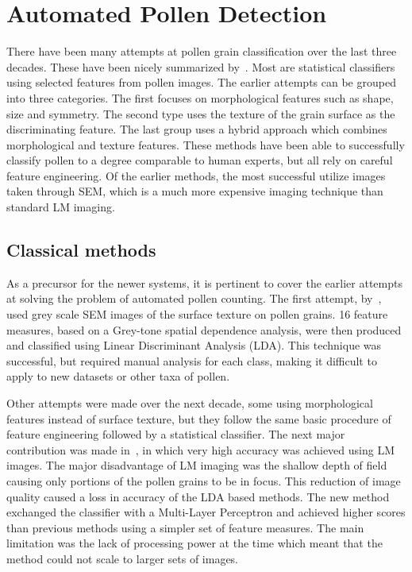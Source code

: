 \section{Automated Pollen Detection}\label{sec:rel-pollen}
There have been many attempts at pollen grain classification over the last three decades.
These have been nicely summarized by\ \textcite{sevillano_improving_2018}.
Most are statistical classifiers using selected features from pollen images.
The earlier attempts can be grouped into three categories.
The first focuses on morphological features such as shape, size and symmetry.
The second type uses the texture of the grain surface as the discriminating feature.
The last group uses a hybrid approach which combines morphological and texture features.
These methods have been able to successfully classify pollen to a degree comparable to human experts, but all rely on careful feature engineering.
Of the earlier methods, the most successful utilize images taken through SEM, which is a much more expensive imaging technique than standard LM imaging.

\subsection{Classical methods}
As a precursor for the newer systems, it is pertinent to cover the earlier attempts at solving the problem of automated pollen counting.
The first attempt, by\ \textcite{langford_computerized_1990}, used grey scale SEM images of the surface texture on pollen grains.
16 feature measures, based on a Grey-tone spatial dependence analysis, were then produced and classified using Linear Discriminant Analysis (LDA).
This technique was successful, but required manual analysis for each class, making it difficult to apply to new datasets or other taxa of pollen.

Other attempts were made over the next decade, some using morphological features instead of surface texture, but they follow the same basic procedure of feature engineering followed by a statistical classifier.
The next major contribution was made in\ \textcite{li_pollen_1999}, in which very high accuracy was achieved using LM images.
The major disadvantage of LM imaging was the shallow depth of field causing only portions of the pollen grains to be in focus.
This reduction of image quality caused a loss in accuracy of the LDA based methods.
The new method exchanged the classifier with a Multi-Layer Perceptron and achieved higher scores than previous methods using a simpler set of feature measures.
The main limitation was the lack of processing power at the time which meant that the method could not scale to larger sets of images.

